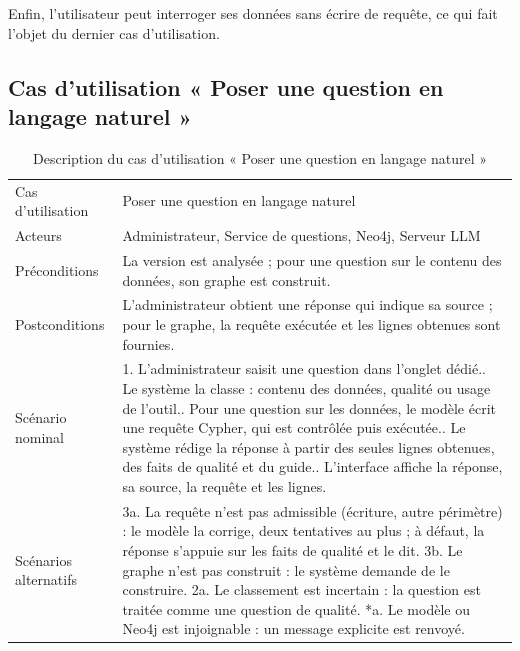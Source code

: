 Enfin, l'utilisateur peut interroger ses données sans écrire de requête, ce qui fait l'objet du dernier cas d'utilisation.

\subsection{Cas d'utilisation « Poser une question en langage naturel »}


\begin{table}[H]
\centering
\small
\begin{tabular}{|L{3.4cm}|L{10.6cm}|}
\hline
{} &  \\ \hline
Cas d'utilisation & Poser une question en langage naturel \\ \hline
Acteurs & Administrateur, Service de questions, Neo4j, Serveur LLM \\ \hline
Préconditions & La version est analysée ; pour une question sur le contenu des données, son graphe est construit. \\ \hline
Postconditions & L'administrateur obtient une réponse qui indique sa source ; pour le graphe, la requête exécutée et les lignes obtenues sont fournies. \\ \hline
Scénario nominal &
1. L'administrateur saisit une question dans l'onglet dédié.. Le système la classe : contenu des données, qualité ou usage de l'outil.. Pour une question sur les données, le modèle écrit une requête Cypher, qui est contrôlée puis exécutée.. Le système rédige la réponse à partir des seules lignes obtenues, des faits de qualité et du guide.. L'interface affiche la réponse, sa source, la requête et les lignes. \\ \hline
Scénarios alternatifs &
3a. La requête n'est pas admissible (écriture, autre périmètre) : le modèle la corrige, deux tentatives au plus ; à défaut, la réponse s'appuie sur les faits de qualité et le dit.\newline
3b. Le graphe n'est pas construit : le système demande de le construire.\newline
2a. Le classement est incertain : la question est traitée comme une question de qualité.\newline
*a. Le modèle ou Neo4j est injoignable : un message explicite est renvoyé. \\ \hline
\end{tabular}
\caption{Description du cas d'utilisation « Poser une question en langage naturel »}
\label{tab:cu-questions}
\end{table}

